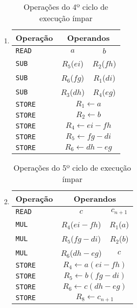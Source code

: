 \begin{enumerate}
\item %

\begin{table}[H]
\centering
\begin{tabular}{l|c|c}
Operação & \multicolumn{2}{c}{Operandos} \\
\hline
\texttt{READ} & $a$ & $b$ \\
\hline
\texttt{SUB} & $R_5$($ei$) & $R_2$($fh$) \\
\texttt{SUB} & $R_6$($fg$) & $R_1$($di$) \\
\texttt{SUB} & $R_3$($dh$) & $R_4$($eg$) \\
\hline
\texttt{STORE} & \multicolumn{2}{c}{$R_1\leftarrow a$} \\
\texttt{STORE} & \multicolumn{2}{c}{$R_2\leftarrow b$} \\
\texttt{STORE} & \multicolumn{2}{c}{$R_4\leftarrow ei - fh$} \\
\texttt{STORE} & \multicolumn{2}{c}{$R_5\leftarrow fg - di$} \\
\texttt{STORE} & \multicolumn{2}{c}{$R_6\leftarrow dh - eg$} \\
\end{tabular}
\caption{Operações do 4º ciclo de execução ímpar}
\label{tab:odd_4}
\end{table}

\item %

\begin{table}[H]
\centering
\begin{tabular}{l|c|c}
Operação & \multicolumn{2}{c}{Operandos} \\
\hline
\texttt{READ} & $c$ & $c_{n+1}$ \\
\hline
\texttt{MUL} & $R_4$($ei - fh$) & $R_1$($a$) \\
\texttt{MUL} & $R_5$($fg - di$) & $R_2$($b$) \\
\texttt{MUL} & $R_6$($dh - eg$) & $c$ \\
\hline
\texttt{STORE} & \multicolumn{2}{c}{$R_4\leftarrow a(ei - fh)$} \\
\texttt{STORE} & \multicolumn{2}{c}{$R_5\leftarrow b(fg - di)$} \\
\texttt{STORE} & \multicolumn{2}{c}{$R_6\leftarrow c(dh - eg)$} \\
\texttt{STORE} & \multicolumn{2}{c}{$R_8\leftarrow c_{n+1}$} \\
\end{tabular}
\caption{Operações do 5º ciclo de execução ímpar}
\label{tab:odd_5}
\end{table}


\end{enumerate}
